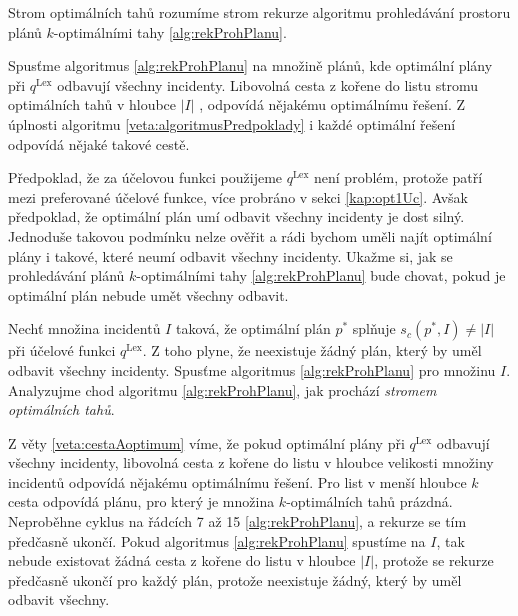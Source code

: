 \begin{definice}
  Strom optimálních tahů rozumíme strom rekurze algoritmu prohledávání prostoru plánů $k$-optimálními tahy \ref{alg:rekProhPlanu}.
\end{definice}

\begin{veta}\label{veta:cestaAoptimum}
  Spusťme algoritmus \ref{alg:rekProhPlanu} na množině plánů, kde optimální plány při $q^{\text{Lex}}$ odbavují všechny incidenty.
  Libovolná cesta z kořene do listu stromu optimálních tahů v hloubce $|I|$ , odpovídá nějakému optimálnímu řešení.
  Z úplnosti algoritmu \ref{veta:algoritmusPredpoklady} i každé optimální řešení odpovídá nějaké takové cestě.
\end{veta}
\begin{dukaz}
\end{dukaz}

Předpoklad, že za účelovou funkci použijeme $q^{\text{Lex}}$ není problém, protože patří mezi preferované účelové funkce, více probráno v sekci \ref{kap:opt1Uc}.
Avšak předpoklad, že optimální plán umí odbavit všechny incidenty je dost silný.
Jednoduše takovou podmínku nelze ověřit a rádi bychom uměli najít optimální plány i takové, které neumí odbavit všechny incidenty.
Ukažme si, jak se prohledávání plánů $k$-optimálními tahy \ref{alg:rekProhPlanu} bude chovat, pokud je optimální plán nebude umět všechny odbavit.

Nechť množina incidentů $I$ taková, že optimální plán $p^*$ splňuje $s_c(p^*, I) \neq |I|$ při účelové funkci $q^{\text{Lex}}$.
Z toho plyne, že neexistuje žádný plán, který by uměl odbavit všechny incidenty.
Spusťme algoritmus \ref{alg:rekProhPlanu} pro množinu $I$.
Analyzujme chod algoritmu \ref{alg:rekProhPlanu}, jak prochází \textit{stromem optimálních tahů}.

Z věty \ref{veta:cestaAoptimum} víme, že pokud optimální plány při $q^{\text{Lex}}$ odbavují všechny incidenty, libovolná 
cesta z kořene do listu v hloubce velikosti množiny incidentů odpovídá nějakému optimálnímu řešení.
Pro list v menší hloubce $k$ cesta odpovídá plánu, pro který je množina $k$-optimálních tahů prázdná.
Neproběhne cyklus na řádcích 7 až 15 \ref{alg:rekProhPlanu}, a rekurze se tím předčasně ukončí.
Pokud algoritmus \ref{alg:rekProhPlanu} spustíme na $I$, tak nebude existovat žádná cesta z kořene do listu v hloubce $|I|$, protože se rekurze předčasně ukončí pro každý plán,
protože neexistuje žádný, který by uměl odbavit všechny.

